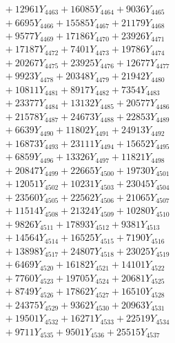 \documentclass[a4paper,10pt]{article}
\begin{document}
{\begin{align}
&\;  + 12961 Y_{4463} + 16085 Y_{4464} + 9036 Y_{4465} \\[0.3ex]
&\;  + 6695 Y_{4466} + 15585 Y_{4467} + 21179 Y_{4468} \\[0.5ex]\allowbreak
&\;  + 9577 Y_{4469} + 17186 Y_{4470} + 23926 Y_{4471} \\[0.3ex]
&\;  + 17187 Y_{4472} + 7401 Y_{4473} + 19786 Y_{4474} \\[0.3ex]
&\;  + 20267 Y_{4475} + 23925 Y_{4476} + 12677 Y_{4477} \\[0.3ex]
&\;  + 9923 Y_{4478} + 20348 Y_{4479} + 21942 Y_{4480} \\[0.3ex]
&\;  + 10811 Y_{4481} + 8917 Y_{4482} + 7354 Y_{4483} \\[0.3ex]
&\;  + 23377 Y_{4484} + 13132 Y_{4485} + 20577 Y_{4486} \\[0.3ex]
&\;  + 21578 Y_{4487} + 24673 Y_{4488} + 22853 Y_{4489} \\[0.3ex]
&\;  + 6639 Y_{4490} + 11802 Y_{4491} + 24913 Y_{4492} \\[0.3ex]
&\;  + 16873 Y_{4493} + 23111 Y_{4494} + 15652 Y_{4495} \\[0.3ex]
&\;  + 6859 Y_{4496} + 13326 Y_{4497} + 11821 Y_{4498} \\[0.5ex]\allowbreak
&\;  + 20847 Y_{4499} + 22665 Y_{4500} + 19730 Y_{4501} \\[0.3ex]
&\;  + 12051 Y_{4502} + 10231 Y_{4503} + 23045 Y_{4504} \\[0.3ex]
&\;  + 23560 Y_{4505} + 22562 Y_{4506} + 21065 Y_{4507} \\[0.3ex]
&\;  + 11514 Y_{4508} + 21324 Y_{4509} + 10280 Y_{4510} \\[0.3ex]
&\;  + 9826 Y_{4511} + 17893 Y_{4512} + 9381 Y_{4513} \\[0.3ex]
&\;  + 14564 Y_{4514} + 16525 Y_{4515} + 7190 Y_{4516} \\[0.3ex]
&\;  + 13898 Y_{4517} + 24807 Y_{4518} + 23025 Y_{4519} \\[0.3ex]
&\;  + 6469 Y_{4520} + 16182 Y_{4521} + 14101 Y_{4522} \\[0.3ex]
&\;  + 7760 Y_{4523} + 19705 Y_{4524} + 20681 Y_{4525} \\[0.3ex]
&\;  + 8749 Y_{4526} + 17862 Y_{4527} + 16510 Y_{4528} \\[0.5ex]\allowbreak
&\;  + 24375 Y_{4529} + 9362 Y_{4530} + 20963 Y_{4531} \\[0.3ex]
&\;  + 19501 Y_{4532} + 16271 Y_{4533} + 22519 Y_{4534} \\[0.3ex]
&\;  + 9711 Y_{4535} + 9501 Y_{4536} + 25515 Y_{4537} \\[0.3ex]

\end{align}}
\end{document}
